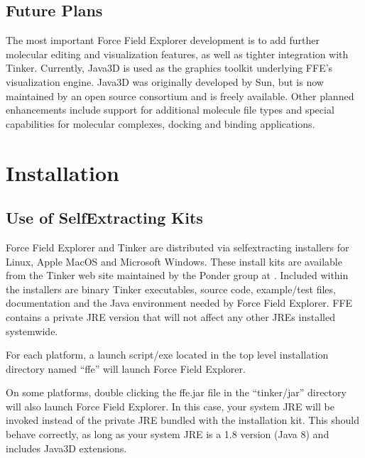 \documentclass[letterpaper,11pt,english]{sphinxmanual}
\begin{document}
\section{Future Plans}
\label{\detokenize{text/introduction:future-plans}}
\sphinxAtStartPar
The most important Force Field Explorer development is to add further molecular editing and visualization features, as well as tighter integration with Tinker. Currently, Java3D is used as the graphics toolkit underlying FFE’s visualization engine. Java3D was originally developed by Sun, but is now maintained by an open source consortium and is freely available. Other planned enhancements include support for additional molecule file types and special capabilities for molecular complexes, docking and binding applications.

\sphinxstepscope


\chapter{Installation}
\label{\detokenize{text/installation:installation}}\label{\detokenize{text/installation::doc}}

\section{Use of Self\sphinxhyphen{}Extracting Kits}
\label{\detokenize{text/installation:use-of-self-extracting-kits}}
\sphinxAtStartPar
Force Field Explorer and Tinker are distributed via self\sphinxhyphen{}extracting installers for Linux, Apple MacOS and Microsoft Windows. These install kits are available from the Tinker web site maintained by the Ponder group at . Included within the installers are binary Tinker executables, source code, example/test files, documentation and the Java environment needed by Force Field Explorer. FFE contains a private JRE version that will not affect any other JREs installed system\sphinxhyphen{}wide.

\sphinxAtStartPar
For each platform, a launch script/exe located in the top level installation directory named “ffe” will launch Force Field Explorer.

\sphinxAtStartPar
On some platforms, double clicking the ffe.jar file in the “tinker/jar” directory will also launch Force Field Explorer. In this case, your system JRE will be invoked instead of the private JRE bundled with the installation kit. This should behave correctly, as long as your system JRE is a 1.8 version (Java 8) and includes Java3D extensions.
\end{document}

